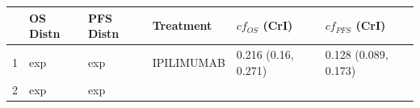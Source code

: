 \documentclass[
]{article}
\begin{document}
\begin{longtable}[]{@{}llllll@{}}
\toprule
\begin{minipage}[b]{0.03\columnwidth}\raggedright
\strut
\end{minipage} & \begin{minipage}[b]{0.11\columnwidth}\raggedright
OS Distn\strut
\end{minipage} & \begin{minipage}[b]{0.11\columnwidth}\raggedright
PFS Distn\strut
\end{minipage} & \begin{minipage}[b]{0.19\columnwidth}\raggedright
Treatment\strut
\end{minipage} & \begin{minipage}[b]{0.19\columnwidth}\raggedright
\(cf_{OS}\) (CrI)\strut
\end{minipage} & \begin{minipage}[b]{0.19\columnwidth}\raggedright
\(cf_{PFS}\) (CrI)\strut
\end{minipage}\tabularnewline
\midrule
\endhead
\begin{minipage}[t]{0.03\columnwidth}\raggedright
1\strut
\end{minipage} & \begin{minipage}[t]{0.11\columnwidth}\raggedright
exp\strut
\end{minipage} & \begin{minipage}[t]{0.11\columnwidth}\raggedright
exp\strut
\end{minipage} & \begin{minipage}[t]{0.19\columnwidth}\raggedright
IPILIMUMAB\strut
\end{minipage} & \begin{minipage}[t]{0.19\columnwidth}\raggedright
0.216 (0.16, 0.271)\strut
\end{minipage} & \begin{minipage}[t]{0.19\columnwidth}\raggedright
0.128 (0.089, 0.173)\strut
\end{minipage}\tabularnewline
\begin{minipage}[t]{0.03\columnwidth}\raggedright
2\strut
\end{minipage} & \begin{minipage}[t]{0.11\columnwidth}\raggedright
exp\strut
\end{minipage} & \begin{minipage}[t]{0.11\columnwidth}\raggedright
exp\strut
\end{minipage} & \begin{minipage}[t]{0.19\columnwidth}\raggedright

\end{minipage}
\end{longtable}
\end{document}
